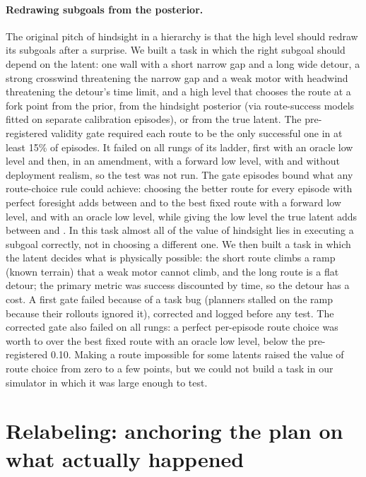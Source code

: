 \documentclass[11pt]{article}
\begin{document}
\paragraph{Redrawing subgoals from the posterior.}\label{sec:redraw} The original pitch of hindsight in a hierarchy is
that the high level should redraw its subgoals after a surprise. We built a task in which the right subgoal should
depend on the latent: one wall with a short narrow gap and a long wide detour, a strong crosswind threatening the narrow
gap and a weak motor with headwind threatening the detour's time limit, and a high level that chooses the route at a fork
point from the prior, from the hindsight posterior (via route-success models fitted on separate calibration episodes),
or from the true latent. The pre-registered validity gate required each route to be the only successful one in at
least 15\% of episodes. It failed on all \fkRungs{} rungs of its ladder, first with an oracle low level and then, in an
amendment, with a forward low level, with and without deployment realism, so the test was not run. The gate episodes
bound what any route-choice rule could achieve: choosing the better route for every episode with perfect foresight adds
between \fkCeilFwdMin{} and \fkCeilFwdMax{} to the best fixed route with a forward low level, and \fkCeilOracleMax{} with
an oracle low level, while giving the low level the true latent adds between \fkLowGainMin{} and \fkLowGainMax{}. In
this task almost all of the value of hindsight lies in executing a subgoal correctly, not in choosing a different one.
We then built a task in which the latent decides what is physically possible: the short route climbs a ramp (known
terrain) that a weak motor cannot climb, and the long route is a flat detour; the primary metric was success discounted by
time, so the detour has a cost. A first gate failed because of a task bug (planners stalled on the ramp because their
rollouts ignored it), corrected and logged before any test. The corrected gate also failed on all \rmRungs{} rungs: a
perfect per-episode route choice was worth \rmCeilOracleMin{} to \rmCeilOracleMax{} over the best fixed route with an
oracle low level, below the pre-registered 0.10. Making a route impossible for some latents raised the value of route
choice from zero to a few points, but we could not build a task in our simulator in which it was large enough to test.

\section{Relabeling: anchoring the plan on what actually happened}
\label{sec:relabel}
\end{document}
